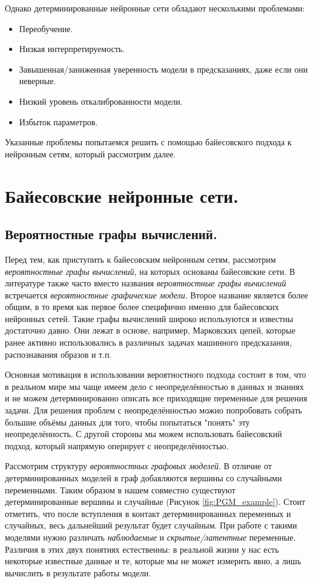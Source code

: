 Однако детерминированные нейронные сети обладают несколькими проблемами:
\begin{itemize}
    \item Переобучение.
    \item Низкая интерпретируемость.
    \item Завышенная/заниженная уверенность модели в предсказаниях, даже если они неверные.
    \item Низкий уровень откалиброванности модели.
    \item Избыток параметров.
\end{itemize}

Указанные проблемы попытаемся решить с помощью байесовского подхода к нейронным сетям, который
 рассмотрим далее.

\section{Байесовские нейронные сети.}
\subsection{Вероятностные графы вычислений.}

Перед тем, как приступить к байесовским нейронным сетям, рассмотрим \textit{вероятностные графы вычислений}, на которых основаны
 байесовские сети. В литературе также часто вместо названия \textit{вероятностные графы вычислений} встречается \textit{вероятностные графические модели}.
 Второе название является более общим, в то время как первое более специфично именно для байесовских нейронных сетей.
 Такие графы вычислений широко используются и известны достаточно давно. Они лежат в основе, например,
 Марковских цепей, которые ранее активно использовались в различных задачах машинного предсказания, распознавания образов и т.п.

Основная мотивация в использовании вероятностного подхода состоит в том, что в реальном мире мы чаще имеем дело с неопределённостью в данных и знаниях
 и не можем детерминированно описать все приходящие переменные для решения задачи. Для решения проблем с неопределённостью
 можно попробовать собрать большие объёмы данных для того, чтобы попытаться "понять" эту неопределённость. С другой стороны
 мы можем использовать байесовский подход, который напрямую оперирует с неопределённостью.

Рассмотрим структуру \textit{вероятностных графовых моделей}. В отличие от детерминированных моделей в граф добавляются вершины
 со случайными переменными. Таким образом в нашем совместно существуют детерминированные вершины и случайные (Рисунок \ref{fig:PGM_example}). Стоит отметить,
 что после вступления в контакт детерминированных переменных и случайных, весь дальнейший результат будет случайным.
 При работе с такими моделями нужно различать \textit{наблюдаемые} и \textit{скрытые/латентные} переменные.
 Различия в этих двух понятиях естественны: в реальной жизни у нас есть некоторые известные данные и те, которые мы не может измерить явно,
 а лишь вычислить в результате работы модели.

